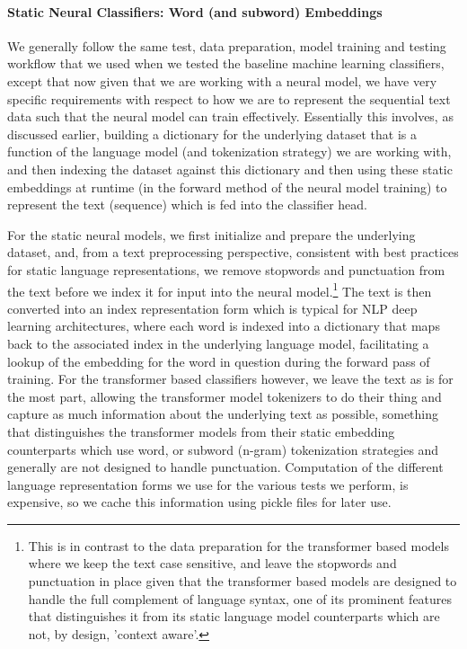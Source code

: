 \documentclass[final]{clv2025}
\begin{document}
\paragraph{Static Neural Classifiers: Word (and subword) Embeddings}
We generally follow the same test, data preparation, model training and testing workflow that we used when we tested the baseline machine learning classifiers, except that now given that we are working with a neural model, we have very specific requirements with respect to how we are to represent the sequential text data such that the neural model can train effectively. Essentially this involves, as discussed earlier, building a dictionary for the underlying dataset that is a function of the language model (and tokenization strategy) we are working with, and then indexing the dataset against this dictionary and then using these static embeddings at runtime (in the forward method of the neural model training) to represent the text (sequence) which is fed into the classifier head.

For the static neural models, we first initialize and prepare the underlying dataset, and, from a text preprocessing perspective, consistent with best practices for static language representations, we remove stopwords and punctuation from the text before we index it for input into the neural model.\footnote{This is in contrast to the data preparation for the transformer based models where we keep the text case sensitive, and leave the stopwords and punctuation in place given that the transformer based models are designed to handle the full complement of language syntax, one of its prominent features that distinguishes it from its static language model counterparts which are not, by design, 'context aware'.} The text is then converted into an index representation form which is typical for NLP deep learning architectures, where each word is indexed into a dictionary that maps back to the associated index in the underlying language model, facilitating a lookup of the embedding for the word in question during the forward pass of training. For the transformer based classifiers however, we leave the text as is for the most part, allowing the transformer model tokenizers to do their thing and capture as much information about the underlying text as possible, something that distinguishes the transformer models from their static embedding counterparts which use word, or subword (n-gram) tokenization strategies and generally are not designed to handle punctuation. Computation of the different language representation forms we use for the various tests we perform, is expensive, so we cache this information using pickle files for later use. 
\end{document}
